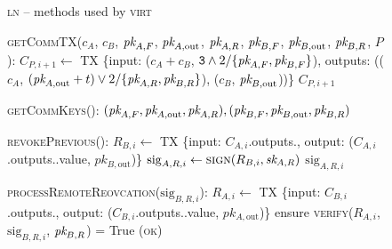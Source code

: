 \begin{figure}[H]
  \begin{processbox}{\textsc{ln} -- methods used by \textsc{virt}}
    \begin{algorithmic}[1]
      \State \textsc{getCommTX}($c_A$, $c_B$, $\textit{pk}_{A, F}$, $\textit{pk}_{A,
      \mathrm{out}}$, $\textit{pk}_{A, R}$, $\textit{pk}_{B, F}$, $\textit{pk}_{B, \mathrm{out}}$, $\textit{pk}_{B,
      R}$, $P$):
      \Indent
        \State $C_{P, i+1} \gets$ TX \{input: ($c_A + c_B$, $\texttt{3} \wedge
        2/\{\textit{pk}_{A, F}, \textit{pk}_{B, F}\}$), outputs: (($c_A$, $(\textit{pk}_{A, \mathrm{out}} +
        t) \vee 2/\{\textit{pk}_{A, R}, \textit{pk}_{B, R}\}$), ($c_B$, $\textit{pk}_{B, \mathrm{out}}$))\}
        \State \Return $C_{P, i+1}$
      \EndIndent
      \Statex

      \State \textsc{getCommKeys}():
      \Indent
        \State \Return $(\textit{pk}_{A, F}, \textit{pk}_{A, \mathrm{out}}, \textit{pk}_{A, R}), (\textit{pk}_{B,
        F}, \textit{pk}_{B, \mathrm{out}}, \textit{pk}_{B, R})$
      \EndIndent
      \Statex

      \State \textsc{revokePrevious}():
      \Indent
        \State $R_{B, i} \gets$ TX \{input: $C_{A, i}$.outputs.\alice, output:
        ($C_{A, i}$.outputs.\alice.value, $pk_{B, \mathrm{out}}$)\}
        \State $\mathrm{sig}_{A, R, i} \gets \textsc{sign}(R_{B, i}, \textit{sk}_{A, R})$
        \State \Return $\mathrm{sig}_{A, R, i}$
      \EndIndent
      \Statex

      \State \textsc{processRemoteReovcation}($\mathrm{sig}_{B, R, i}$):
      \Indent
        \State $R_{A, i} \gets$ TX \{input: $C_{B, i}$.outputs.\bob, output:
        ($C_{B, i}$.outputs.\bob.value, $pk_{A, \mathrm{out}}$)\}
        \State ensure \textsc{verify}($R_{A, i}$, $\mathrm{sig}_{B, R, i}$,
        $\textit{pk}_{B, R}$) = True
        \State \Return (\textsc{ok})
      \EndIndent
    \end{algorithmic}
  \end{processbox}
  \caption{}
  \label{code:ln:methods-for-virt}
\end{figure}

